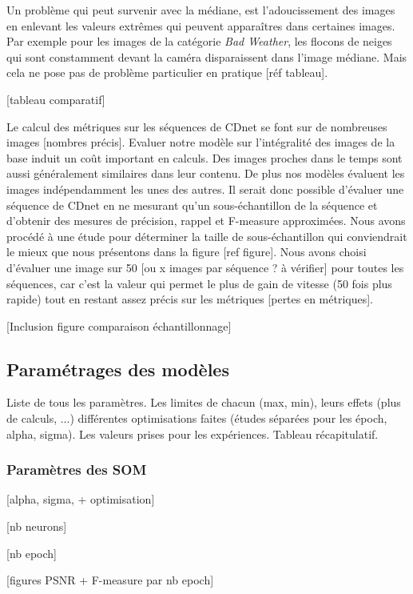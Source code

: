 	Un problème qui peut survenir avec la médiane, est l'adoucissement des images en enlevant les valeurs extrêmes qui peuvent apparaîtres dans certaines images. Par exemple pour les images de la catégorie \textit{Bad Weather}, les flocons de neiges qui sont constamment devant la caméra disparaissent dans l'image médiane. Mais cela ne pose pas de problème particulier en pratique [réf tableau].

	[tableau comparatif]
	
	Le calcul des métriques sur les séquences de CDnet se font sur de nombreuses images [nombres précis]. Evaluer notre modèle sur l'intégralité des images de la base induit un coût important en calculs. Des images proches dans le temps sont aussi généralement similaires dans leur contenu. De plus nos modèles évaluent les images indépendamment les unes des autres. Il serait donc possible d'évaluer une séquence de CDnet en ne mesurant qu'un sous-échantillon de la séquence et d'obtenir des mesures de précision, rappel et F-measure approximées. Nous avons procédé à une étude pour déterminer la taille de sous-échantillon qui conviendrait le mieux que nous présentons dans la figure [ref figure]. Nous avons choisi d'évaluer une image sur 50 [ou x images par séquence ? à vérifier] pour toutes les séquences, car c'est la valeur qui permet le plus de gain de vitesse (50 fois plus rapide) tout en restant assez précis sur les métriques [pertes en métriques].   

	[Inclusion figure comparaison échantillonnage]

	\subsection{Paramétrages des modèles}

	Liste de tous les paramètres. Les limites de chacun (max, min), leurs effets (plus de calculs, ...) différentes optimisations faites (études séparées pour les époch, alpha, sigma). Les valeurs prises pour les expériences. Tableau récapitulatif.

	\subsubsection{Paramètres des SOM}

	[alpha, sigma, + optimisation] 
	
	[nb neurons]

	[nb epoch]

	[figures PSNR + F-measure par nb epoch]

